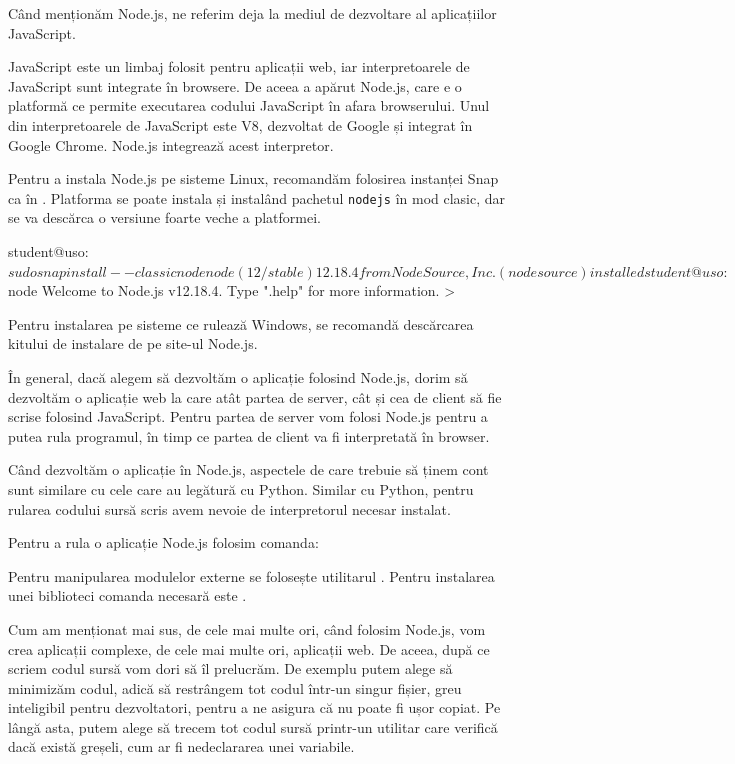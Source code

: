Când menționăm Node.js, ne referim deja la mediul de dezvoltare al aplicațiilor JavaScript.

JavaScript este un limbaj folosit pentru aplicații web, iar interpretoarele de JavaScript sunt integrate în browsere.
De aceea a apărut Node.js, care e o platformă ce permite executarea codului JavaScript în afara browserului.
Unul din interpretoarele de JavaScript este V8, dezvoltat de Google și integrat în Google Chrome.
Node.js integrează acest interpretor.

Pentru a instala Node.js pe sisteme Linux, recomandăm folosirea instanței Snap ca în .
Platforma se poate instala și instalând pachetul \texttt{nodejs} în mod clasic, dar se va descărca o versiune foarte veche a platformei.

\begin{screen}[caption={Instalare Node.js},label={lst:appdev:install-nodejs}]
student@uso:~$ sudo snap install --classic node
node (12/stable) 12.18.4 from NodeSource, Inc.
(nodesource) installed

student@uso:~$ node
Welcome to Node.js v12.18.4.
Type ".help" for more information.
>
\end{screen}

Pentru instalarea pe sisteme ce rulează Windows, se recomandă descărcarea kitului de instalare de pe site-ul Node.js.

În general, dacă alegem să dezvoltăm o aplicație folosind Node.js, dorim să dezvoltăm o aplicație web la care atât partea de server, cât și cea de client să fie scrise folosind JavaScript.
Pentru partea de server vom folosi Node.js pentru a putea rula programul, în timp ce partea de client va fi interpretată în browser.

Când dezvoltăm o aplicație în Node.js, aspectele de care trebuie să ținem cont sunt similare cu cele care au legătură cu Python.
Similar cu Python, pentru rularea codului sursă scris avem nevoie de interpretorul necesar instalat.

Pentru a rula o aplicație Node.js folosim comanda:


Pentru manipularea modulelor externe se folosește utilitarul .
Pentru instalarea unei biblioteci comanda necesară este .

Cum am menționat mai sus, de cele mai multe ori, când folosim Node.js, vom crea aplicații complexe, de cele mai multe ori, aplicații web.
De aceea, după ce scriem codul sursă vom dori să îl prelucrăm.
De exemplu putem alege să minimizăm codul, adică să restrângem tot codul într-un singur fișier, greu inteligibil pentru dezvoltatori, pentru a ne asigura că nu poate fi ușor copiat.
Pe lângă asta, putem alege să trecem tot codul sursă printr-un utilitar care verifică dacă există greșeli, cum ar fi nedeclararea unei variabile.

